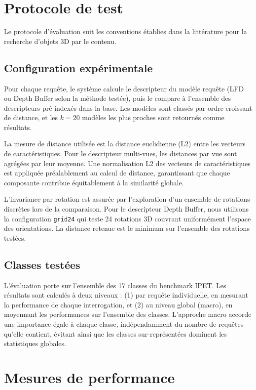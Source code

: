 \documentclass[11pt,a4paper,oneside]{report}
\begin{document}
\section{Protocole de test}

Le protocole d'évaluation suit les conventions établies dans la littérature pour la recherche d'objets 3D par le contenu.

\subsection{Configuration expérimentale}

Pour chaque requête, le système calcule le descripteur du modèle requête (LFD ou Depth Buffer selon la méthode testée), puis le compare à l'ensemble des descripteurs pré-indexés dans la base. Les modèles sont classés par ordre croissant de distance, et les $k = 20$ modèles les plus proches sont retournés comme résultats.

La mesure de distance utilisée est la distance euclidienne (L2) entre les vecteurs de caractéristiques. Pour le descripteur multi-vues, les distances par vue sont agrégées par leur moyenne. Une normalisation L2 des vecteurs de caractéristiques est appliquée préalablement au calcul de distance, garantissant que chaque composante contribue équitablement à la similarité globale.

L'invariance par rotation est assurée par l'exploration d'un ensemble de rotations discrètes lors de la comparaison. Pour le descripteur Depth Buffer, nous utilisons la configuration \texttt{grid24} qui teste 24 rotations 3D couvrant uniformément l'espace des orientations. La distance retenue est le minimum sur l'ensemble des rotations testées.

\subsection{Classes testées}

L'évaluation porte sur l'ensemble des 17 classes du benchmark IPET. Les résultats sont calculés à deux niveaux : (1) par requête individuelle, en mesurant la performance de chaque interrogation, et (2) au niveau global (macro), en moyennant les performances sur l'ensemble des classes. L'approche macro accorde une importance égale à chaque classe, indépendamment du nombre de requêtes qu'elle contient, évitant ainsi que les classes sur-représentées dominent les statistiques globales.

\section{Mesures de performance}
\end{document}
